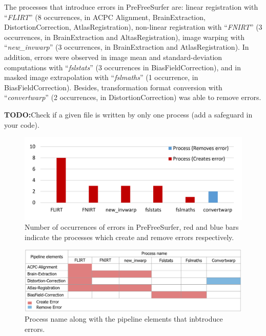 \documentclass{article}
\newcommand{\todo}[1]{\color{red}\textbf{TODO:}#1\color{black}}
\begin{document}
The processes that introduce errors in PreFreeSurfer are: linear
registration with “\emph{FLIRT}” (8 occurrences, in ACPC Alignment,
BrainExtraction, DistortionCorrection, AtlasRegistration), non-linear
registration with “\emph{FNIRT}” (3 occurrences, in BrainExtraction
and AltasRegistration), image warping with “\emph{new\_invwarp}” (3
occurrences, in BrainExtraction and AtlasRegistration).  In addition,
errors were observed in image mean and standard-deviation computations
with “\emph{fslstats}” (3 occurrences in BiasFieldCorrection), and in
masked image extrapolation with “\emph{fslmaths}” (1 occurrence, in
BiasFieldCorrection).  Besides, transformation format conversion with
“\emph{convertwarp}” (2 occurrences, in DistortionCorrection) was able
to remove errors.

\todo{Check if a given file is written by only one process (add a safeguard in your code).}


\begin{figure}[H]
\centering
  \includegraphics[scale=0.3]{images/pfs_chart.png}
  \caption{Number of occurrences of errors in PreFreeSurfer, red and blue bars 
indicate the processes which create and remove errors respectively.}
  \label{fig:pfs_chart}
\end{figure}

\begin{figure}[H]
\centering
  \includegraphics[scale=0.5]{images/pfs_table.png}
  \caption{Process name along with the pipeline elements that inbtroduce errors.}
  \label{fig:pfs_table}
\end{figure}
\end{document}
